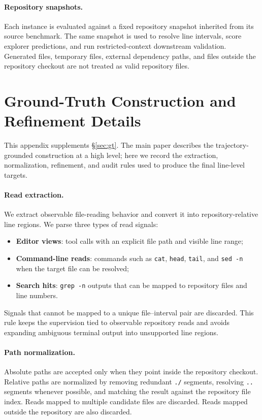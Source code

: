 \paragraph{Repository snapshots.}
Each instance is evaluated against a fixed repository snapshot inherited from
its source benchmark. The same snapshot is used to resolve line intervals, score
explorer predictions, and run restricted-context downstream validation.
Generated files, temporary files, external dependency paths, and files outside
the repository checkout are not treated as valid repository files.


\section{Ground-Truth Construction and Refinement Details}
\label{app:refine}
\label{app:gt_construction}

This appendix supplements \S\ref{sec:gt}. The main paper describes the
trajectory-grounded construction at a high level; here we record the extraction,
normalization, refinement, and audit rules used to produce the final line-level
targets.



\paragraph{Read extraction.}
We extract observable file-reading behavior and convert it into
repository-relative line regions. We parse three types of read signals:
\begin{itemize}
    \item \textbf{Editor views}: tool calls with an explicit file path and visible line range;
    \item \textbf{Command-line reads}: commands such as \texttt{cat}, \texttt{head}, \texttt{tail}, and \texttt{sed -n} when the target file can be resolved;
    \item \textbf{Search hits}: \texttt{grep -n} outputs that can be mapped to repository files and line numbers.
\end{itemize}
Signals that cannot be mapped to a unique file--interval pair are discarded.
This rule keeps the supervision tied to observable repository reads and avoids
expanding ambiguous terminal output into unsupported line regions.

\paragraph{Path normalization.}
Absolute paths are accepted only when they point inside the repository checkout.
Relative paths are normalized by removing redundant \texttt{./} segments,
resolving \texttt{..} segments whenever possible, and matching the result
against the repository file index. Reads mapped to multiple candidate files are
discarded. Reads mapped outside the repository are also discarded.


